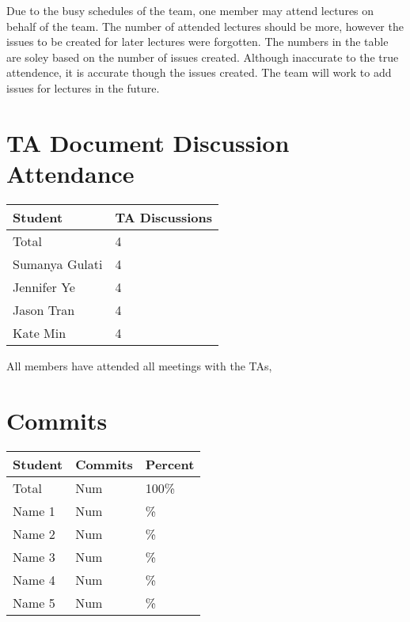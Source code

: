 \documentclass{article}
\begin{document}
Due to the busy schedules of the team, one member may attend lectures on behalf
of the team. The number of attended lectures should be more, however the issues
to be created for later lectures were forgotten. The numbers in the table are soley
based on the number of issues created. Although inaccurate to the true
attendence, it is accurate though the issues created. The team will work to add
issues for lectures in the future. 

\section{TA Document Discussion Attendance}

\begin{table}[H]
\centering
\begin{tabular}{ll}
\toprule
\textbf{Student} & \textbf{TA Discussions}\\
\midrule
Total & 4\\
Sumanya Gulati & 4\\
Jennifer Ye & 4\\
Jason Tran & 4\\
Kate Min & 4\\
\bottomrule
\end{tabular}
\end{table}

All members have attended all meetings with the TAs,

\section{Commits}


\begin{table}[H]
\centering
\begin{tabular}{lll}
\toprule
\textbf{Student} & \textbf{Commits} & \textbf{Percent}\\
\midrule
Total & Num & 100\% \\
Name 1 & Num & \% \\
Name 2 & Num & \% \\
Name 3 & Num & \% \\
Name 4 & Num & \% \\
Name 5 & Num & \% \\
\bottomrule
\end{tabular}
\end{table}
\end{document}
